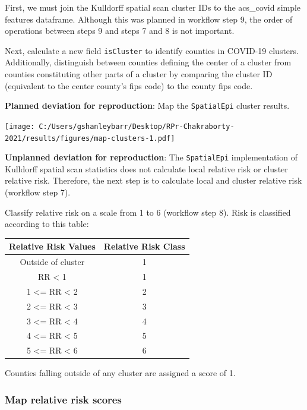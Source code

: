 \documentclass[
]{article}
\begin{document}
First, we must join the Kulldorff spatial scan cluster IDs to the
acs\_covid simple features dataframe. Although this was planned in
workflow step 9, the order of operations between steps 9 and steps 7 and
8 is not important.

Next, calculate a new field \texttt{isCluster} to identify counties in
COVID-19 clusters. Additionally, distinguish between counties defining
the center of a cluster from counties constituting other parts of a
cluster by comparing the cluster ID (equivalent to the center county's
fips code) to the county fips code.

\textbf{Planned deviation for reproduction}: Map the \texttt{SpatialEpi}
cluster results.

\texttt{[image: C:/Users/gshanleybarr/Desktop/RPr-Chakraborty-2021/results/figures/map-clusters-1.pdf]}

\textbf{Unplanned deviation for reproduction}: The \texttt{SpatialEpi}
implementation of Kulldorff spatial scan statistics does not calculate
local relative risk or cluster relative risk. Therefore, the next step
is to calculate local and cluster relative risk (workflow step 7).

Classify relative risk on a scale from 1 to 6 (workflow step 8). Risk is
classified according to this table:

\begin{longtable}[]{@{}cc@{}}
\toprule\noalign{}
Relative Risk Values & Relative Risk Class \\
\midrule\noalign{}
\endhead
\bottomrule\noalign{}
\endlastfoot
Outside of cluster & 1 \\
RR \textless{} 1 & 1 \\
1 \textless= RR \textless{} 2 & 2 \\
2 \textless= RR \textless{} 3 & 3 \\
3 \textless= RR \textless{} 4 & 4 \\
4 \textless= RR \textless{} 5 & 5 \\
5 \textless= RR \textless{} 6 & 6 \\
\end{longtable}

Counties falling outside of any cluster are assigned a score of 1.

\hypertarget{map-relative-risk-scores}{%
\subsubsection{Map relative risk
scores}\label{map-relative-risk-scores}}
\end{document}
